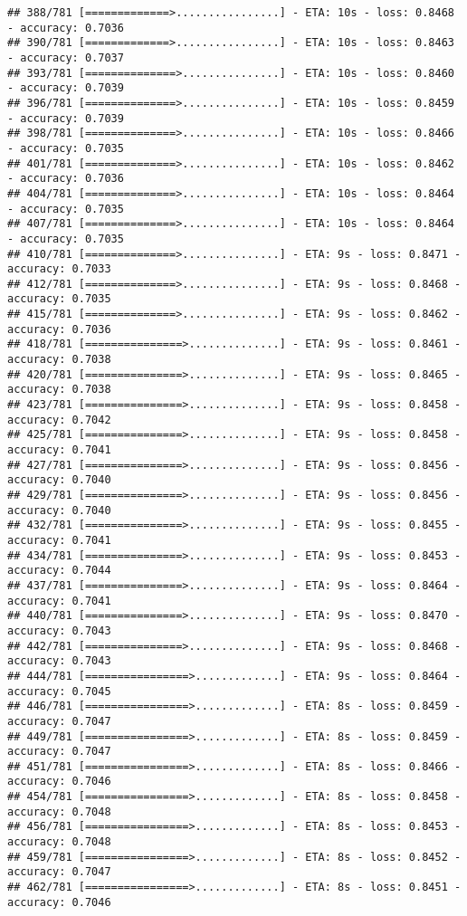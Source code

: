 \documentclass[
]{article}
\begin{document}
\begin{verbatim}
## 388/781 [=============>................] - ETA: 10s - loss: 0.8468 - accuracy: 0.7036
## 390/781 [=============>................] - ETA: 10s - loss: 0.8463 - accuracy: 0.7037
## 393/781 [==============>...............] - ETA: 10s - loss: 0.8460 - accuracy: 0.7039
## 396/781 [==============>...............] - ETA: 10s - loss: 0.8459 - accuracy: 0.7039
## 398/781 [==============>...............] - ETA: 10s - loss: 0.8466 - accuracy: 0.7035
## 401/781 [==============>...............] - ETA: 10s - loss: 0.8462 - accuracy: 0.7036
## 404/781 [==============>...............] - ETA: 10s - loss: 0.8464 - accuracy: 0.7035
## 407/781 [==============>...............] - ETA: 10s - loss: 0.8464 - accuracy: 0.7035
## 410/781 [==============>...............] - ETA: 9s - loss: 0.8471 - accuracy: 0.7033 
## 412/781 [==============>...............] - ETA: 9s - loss: 0.8468 - accuracy: 0.7035
## 415/781 [==============>...............] - ETA: 9s - loss: 0.8462 - accuracy: 0.7036
## 418/781 [===============>..............] - ETA: 9s - loss: 0.8461 - accuracy: 0.7038
## 420/781 [===============>..............] - ETA: 9s - loss: 0.8465 - accuracy: 0.7038
## 423/781 [===============>..............] - ETA: 9s - loss: 0.8458 - accuracy: 0.7042
## 425/781 [===============>..............] - ETA: 9s - loss: 0.8458 - accuracy: 0.7041
## 427/781 [===============>..............] - ETA: 9s - loss: 0.8456 - accuracy: 0.7040
## 429/781 [===============>..............] - ETA: 9s - loss: 0.8456 - accuracy: 0.7040
## 432/781 [===============>..............] - ETA: 9s - loss: 0.8455 - accuracy: 0.7041
## 434/781 [===============>..............] - ETA: 9s - loss: 0.8453 - accuracy: 0.7044
## 437/781 [===============>..............] - ETA: 9s - loss: 0.8464 - accuracy: 0.7041
## 440/781 [===============>..............] - ETA: 9s - loss: 0.8470 - accuracy: 0.7043
## 442/781 [===============>..............] - ETA: 9s - loss: 0.8468 - accuracy: 0.7043
## 444/781 [================>.............] - ETA: 9s - loss: 0.8464 - accuracy: 0.7045
## 446/781 [================>.............] - ETA: 8s - loss: 0.8459 - accuracy: 0.7047
## 449/781 [================>.............] - ETA: 8s - loss: 0.8459 - accuracy: 0.7047
## 451/781 [================>.............] - ETA: 8s - loss: 0.8466 - accuracy: 0.7046
## 454/781 [================>.............] - ETA: 8s - loss: 0.8458 - accuracy: 0.7048
## 456/781 [================>.............] - ETA: 8s - loss: 0.8453 - accuracy: 0.7048
## 459/781 [================>.............] - ETA: 8s - loss: 0.8452 - accuracy: 0.7047
## 462/781 [================>.............] - ETA: 8s - loss: 0.8451 - accuracy: 0.7046

\end{verbatim}
\end{document}
